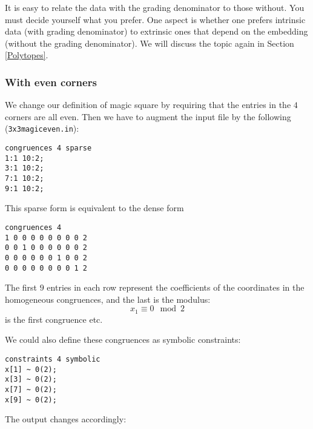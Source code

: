 \documentclass[12pt,a4paper]{scrartcl}
\theoremstyle{definition}
\def\ttt{\texttt}
\begin{document}
It is easy to relate the data with the grading denominator to those without. You must decide yourself what you prefer. One aspect is whether one prefers intrinsic data (with grading denominator) to extrinsic ones that depend on the embedding (without the grading denominator). We will discuss the topic again in Section \ref{Polytopes}.

\subsubsection{With even corners}\label{magiceven}\label{cong_ex}

We change our definition of magic square by requiring that the
entries in the $4$ corners are all even. Then we have to
augment the input file by the following (\ttt{3x3magiceven.in}):
\begin{Verbatim}
congruences 4 sparse
1:1 10:2;
3:1 10:2;
7:1 10:2;
9:1 10:2;
\end{Verbatim}
This sparse form is equivalent to the dense form
\begin{Verbatim}
congruences 4
1 0 0 0 0 0 0 0 0 2
0 0 1 0 0 0 0 0 0 2
0 0 0 0 0 0 1 0 0 2
0 0 0 0 0 0 0 0 1 2
\end{Verbatim}
The first $9$ entries in each row represent the coefficients of the coordinates in the homogeneous congruences, and the last is the modulus:
$$
x_1\equiv 0\mod 2
$$
is the first congruence etc.

We could also define these congruences as symbolic constraints:
\begin{Verbatim}
constraints 4 symbolic
x[1] ~ 0(2);
x[3] ~ 0(2);
x[7] ~ 0(2);
x[9] ~ 0(2);
\end{Verbatim}

The output changes accordingly:
\end{document}
